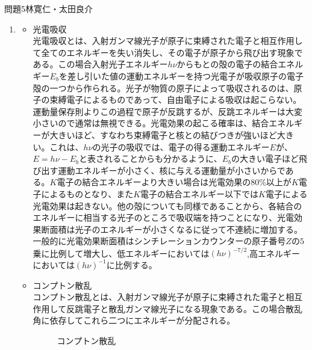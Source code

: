\documentclass[fleqn]{jbook}
\begin{document}
\begin{answer}{問題5}{林寛仁・太田良介}
\begin{enumerate}
\item 
\begin{itemize}
	\item 光電吸収\\
	光電吸収とは、入射ガンマ線光子が原子に束縛された電子と相互作用して全てのエネルギーを失い消失し、その電子が原子から飛び出す現象である。この場合入射光子エネルギー$h\nu$からもとの殻の電子の結合エネルギー$E_b$を差し引いた値の運動エネルギーを持つ光電子が吸収原子の電子殻の一つから作られる。光子が物質の原子によって吸収されるのは、原子の束縛電子によるものであって、自由電子による吸収は起こらない。運動量保存則よりこの過程で原子が反跳するが、反跳エネルギーは大変小さいので通常は無視できる。光電効果の起こる確率は、結合エネルギーが大きいほど、すなわち束縛電子と核との結びつきが強いほど大きい。これは、$h\nu$の光子の吸収では、電子の得る運動エネルギー$E$が、$E=h\nu - E_b$と表されることからも分かるように、$E_b$の大きい電子ほど飛び出す運動エネルギーが小さく、核に与える運動量が小さいからである。$K$電子の結合エネルギーより大きい場合は光電効果の80\%以上が$K$電子によるものとなり、また$K$電子の結合エネルギー以下では$K$電子による光電効果は起きない。他の殻についても同様であることから、各結合のエネルギーに相当する光子のところで吸収端を持つことになり、光電効果断面積は光子のエネルギーが小さくなるに従って不連続に増加する。一般的に光電効果断面積はシンチレーションカウンターの原子番号$Z$の$5$乗に比例して増大し、低エネルギーにおいては$(h\nu )^{-7/2}$,高エネルギーにおいては$(h\nu )^{-1}$に比例する。
	\item コンプトン散乱\\
	コンプトン散乱とは、入射ガンマ線光子が原子に束縛された電子と相互作用して反跳電子と散乱ガンマ線光子になる現象である。この場合散乱角に依存してこれら二つにエネルギーが分配される。
	\begin{figure}[h]
		\begin{center}
		\caption{コンプトン散乱}

\end{center}
\end{figure}
\end{itemize}
\end{enumerate}
\end{answer}
\end{document}
